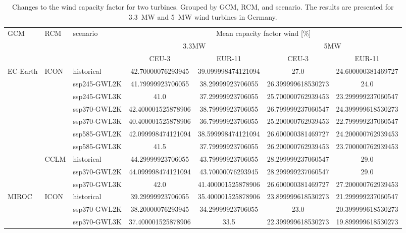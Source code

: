\begin{table}[!htbp]
\centering
\caption{Changes to the wind capacity factor for two turbines. Grouped by GCM, RCM, and scenario. The results are presented for \qty{3.3}{\mega\watt} and \qty{5}{\mega\watt} wind turbines in Germany.}
\label{Table:CF_Wind_changes}
\begin{tabular}{lll|cc|cc}
\toprule
GCM & RCM & scenario & \multicolumn{4}{c}{Mean capacity factor wind [\%]} \\
 & & & \multicolumn{2}{c}{3.3\si{\mega\watt}} & \multicolumn{2}{c}{5\si{\mega\watt}} \\
 & & & CEU-3 & EUR-11 & CEU-3 & EUR-11 \\
\midrule
\cmidrule(lr){1-7}
\multirow{10}{*}{EC-Earth} & \multirow{7}{*}{ICON} & historical & 42.70000076293945 & 39.099998474121094 & 27.0 & 24.600000381469727 \\
 &  & ssp245-GWL2K & 41.79999923706055 & 38.29999923706055 & 26.399999618530273 & 24.0 \\
 &  & ssp245-GWL3K & 41.0 & 37.29999923706055 & 25.700000762939453 & 23.299999237060547 \\
 &  & ssp370-GWL2K & 42.400001525878906 & 38.79999923706055 & 26.799999237060547 & 24.399999618530273 \\
 &  & ssp370-GWL3K & 40.400001525878906 & 36.79999923706055 & 25.200000762939453 & 22.799999237060547 \\
 &  & ssp585-GWL2K & 42.099998474121094 & 38.599998474121094 & 26.600000381469727 & 24.200000762939453 \\
 &  & ssp585-GWL3K & 41.5 & 37.79999923706055 & 26.200000762939453 & 23.700000762939453 \\
\cmidrule(lr){2-7}
 & \multirow{3}{*}{CCLM} & historical & 44.29999923706055 & 43.79999923706055 & 28.299999237060547 & 29.0 \\
 &  & ssp370-GWL2K & 44.099998474121094 & 43.70000076293945 & 28.299999237060547 & 29.0 \\
 &  & ssp370-GWL3K & 42.0 & 41.400001525878906 & 26.600000381469727 & 27.200000762939453 \\
\cmidrule(lr){2-7}
\multirow{6}{*}{MIROC} & \multirow{3}{*}{ICON} & historical & 39.29999923706055 & 35.400001525878906 & 23.899999618530273 & 21.299999237060547 \\
 &  & ssp370-GWL2K & 38.20000076293945 & 34.29999923706055 & 23.0 & 20.399999618530273 \\
 &  & ssp370-GWL3K & 37.400001525878906 & 33.5 & 22.399999618530273 & 19.899999618530273 \\

\end{tabular}
\end{table}
